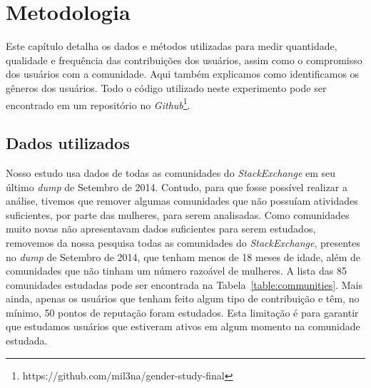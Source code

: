 \chapter{Metodologia}
\label{ch:metodos}

Este capítulo detalha os dados e métodos utilizadas para medir quantidade, qualidade e frequência das contribuições dos usuários, assim como o compromisso dos usuários com a comunidade. Aqui também explicamos como identificamos os gêneros dos usuários. Todo o código utilizado neste experimento pode ser encontrado em um repositório no \emph{Github}\footnote{https://github.com/mil3na/gender-study-final}. 

\section{Dados utilizados}

Nosso estudo usa dados de todas as comunidades do \emph{StackExchange} em seu último \emph{dump} de Setembro de 2014. Contudo, para que fosse possível realizar a análise, tivemos que remover  algumas comunidades que  não possuíam atividades suficientes, por parte das mulheres, para serem analisadas. Como comunidades muito novas não apresentavam dados suficientes para serem estudados, removemos da nossa pesquisa todas as comunidades do \emph{StackExchange}, presentes no \emph{dump} de Setembro de 2014, que tenham menos de 18 meses de idade, além de comunidades que não tinham um número razoável de mulheres. A lista das 85 comunidades estudadas pode ser encontrada na Tabela~\ref{table:communities}. Mais ainda, apenas os usuários que tenham feito algum tipo de contribuição e têm, no mínimo, 50 pontos de reputação foram estudados. Esta limitação é para garantir que estudamos usuários que estiveram ativos em algum momento na comunidade estudada.

